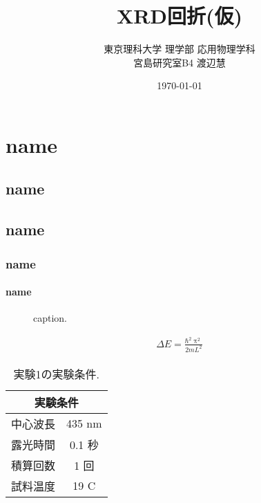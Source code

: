 \documentclass[11pt]{jsarticle}%
\title{XRD回折(仮)}%
\author{東京理科大学 理学部 応用物理学科\\宮島研究室B4 渡辺慧}%
\date{\today}%
\begin{document}
\maketitle%

\newpage

\tableofcontents%
\listoffigures%

 \section{name}%
 \subsection{name}%
 \subsection*{name}%
 \subsubsection{name}%
 \paragraph{name}
\fi



 \begin{figure}[h]%
  \centering%
  \caption{caption.}%
  \label{label}%
 \end{figure}%
\fi

 \begin{align}%
  \Delta E=\frac{\mathrm{\hbar}^{2}\uppi^{2}}{2mL^{2}}%
  \label{eq_qw}%
 \end{align}%
\fi

 \begin{table}[ht]%
  \centering
  \caption{実験1の実験条件.}
  \begin{tabular}{lc}\hline
   \multicolumn{2}{c}{実験条件} \\ \hline
   中心波長 & 435 nm            \\
   露光時間 & 0.1 秒            \\
   積算回数 & 1 回              \\
   試料温度 & 19 C              \\ \hline
  \end{tabular}
  \label{col_1}%
 \end{table}%
\fi
\end{document}

